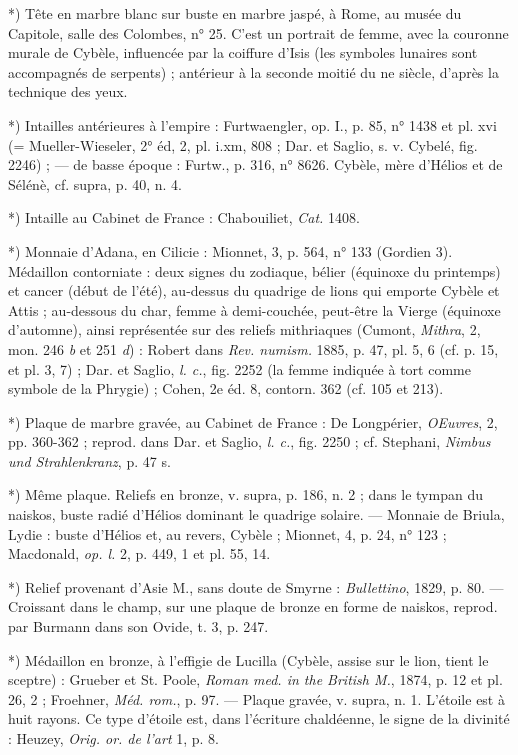 \documentclass[a4paper, 11pt, oneside, polutonikogreek, french]{article}
\begin{document}
*) Tête en marbre blanc sur buste en marbre jaspé, à Rome, au musée du Capitole, salle des Colombes, n° 25. C'est un portrait de femme, avec la couronne murale de Cybèle, influencée par la coiffure d'Isis (les symboles lunaires sont accompagnés de serpents) ; antérieur à la seconde moitié du ne siècle, d'après la technique des yeux.

*) Intailles antérieures à l'empire : Furtwaengler, op. I., p. 85, n° 1438 et pl. xvi (= Mueller-Wieseler, 2° éd, 2, pl. i.xm, 808 ; Dar. et Saglio, s. v. Cybelé, fig. 2246) ; --- de basse époque : Furtw., p. 316, n° 8626. Cybèle, mère d'Hélios et de Sélénè, cf. supra, p. 40, n. 4.

*) Intaille au Cabinet de France : Chabouiliet, \emph{Cat.} 1408.

*) Monnaie d'Adana, en Cilicie : Mionnet, 3, p. 564, n° 133 (Gordien 3). Médaillon contorniate : deux signes du zodiaque, bélier (équinoxe du printemps) et cancer (début de l'été), au-dessus du quadrige de lions qui emporte Cybèle et Attis ; au-dessous du char, femme à demi-couchée, peut-être la Vierge (équinoxe d'automne), ainsi représentée sur des reliefs mithriaques (Cumont, \emph{Mithra}, 2, mon. 246 \emph{b} et 251 \emph{d}) : Robert dans \emph{Rev. numism.} 1885, p. 47, pl. 5, 6 (cf. p. 15, et pl. 3, 7) ; Dar. et Saglio, \emph{l. c.}, fig. 2252 (la femme indiquée à tort comme symbole de la Phrygie) ; Cohen, 2e éd. 8, contorn. 362 (cf. 105 et 213).

*) Plaque de marbre gravée, au Cabinet de France : De Longpérier, \emph{OEuvres}, 2, pp. 360-362 ; reprod. dans Dar. et Saglio, \emph{l. c.}, fig. 2250 ; cf. Stephani, \emph{Nimbus und Strahlenkranz}, p. 47 s.

*) Même plaque. Reliefs en bronze, v. supra, p. 186, n. 2 ; dans le tympan du naiskos, buste radié d'Hélios dominant le quadrige solaire. --- Monnaie de Briula, Lydie : buste d'Hélios et, au revers, Cybèle ; Mionnet, 4, p. 24, n° 123 ; Macdonald, \emph{op. l.} 2, p. 449, 1 et pl. 55, 14.

*) Relief provenant d'Asie M., sans doute de Smyrne : \emph{Bullettino}, 1829, p. 80. --- Croissant dans le champ, sur une plaque de bronze en forme de naiskos, reprod. par Burmann dans son Ovide, t. 3, p. 247.

*) Médaillon en bronze, à l'effigie de Lucilla (Cybèle, assise sur le lion, tient le sceptre) : Grueber et St. Poole, \emph{Roman med. in the British M.}, 1874, p. 12 et pl. 26, 2 ; Froehner, \emph{Méd. rom.}, p. 97. --- Plaque gravée, v. supra, n. 1. L'étoile est à huit rayons. Ce type d'étoile est, dans l'écriture chaldéenne, le signe de la divinité : Heuzey, \emph{Orig. or. de l'art} 1, p. 8.
\end{document}
